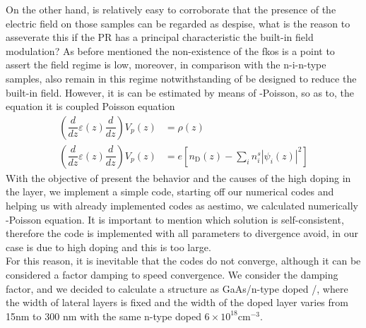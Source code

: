On the other hand, is relatively easy to corroborate that the presence of the electric field on those samples can be regarded as despise, what is the reason to asseverate this if the PR has a principal characteristic the built-in field modulation?
As before mentioned the non-existence of the \gls{fkos} is a point to assert the field regime is low, moreover, in comparison with the n-i-n-type samples, also remain in this regime notwithstanding of be designed to reduce the built-in field. However, it is can be estimated by means of \sch-Poisson, so as to, the equation  it is coupled Poisson equation\cite{jirauschek2014modeling,harrison2016chap3}
\begin{align}
	\left(\dfrac{d}{dz}\varepsilon(z)\dfrac{d}{dz}\right) V_{p}(z)&=\rho (z)
	\label{eq:chapter-3-poisson-equation-1}\\
	\left(\dfrac{d}{dz}\varepsilon(z)\dfrac{d}{dz}\right) V_{p}(z)&=e\left[n_{\mathrm{D}}(z)-\sum_{i}n_{i}^{s}\left|\psi_{i}(z)\right|^2\right]
	\label{eq:chapter-3-poisson-equation-2}
\end{align}
With the objective of present the behavior and the causes of the high doping in the \algaas layer, we implement a simple code, starting off our numerical codes and helping us with already implemented codes as \gls{aestimo}\cite{hebal2021general},  we calculated numerically \sch-Poisson equation. It is important to mention which solution is self-consistent, therefore the code is implemented with all parameters to divergence avoid,  in our case is due to high doping and this is too large.\\
For this reason, it is inevitable that the codes do not converge, although it can be considered a factor damping to speed convergence\cite{ram2004theschrodinger}.
We consider the damping factor, and we decided to calculate a structure as GaAs/n-type doped \algaas/\algaas, where the width of lateral layers is fixed and the width of the doped layer varies from 15nm to 300 nm with the same n-type doped $6\times 10^{18} \mathrm{cm^{-3}}$.
